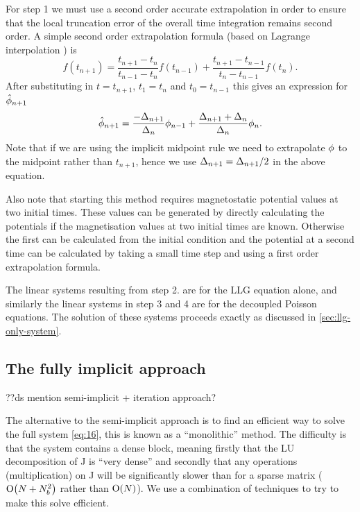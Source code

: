 For step 1 we must use a second order accurate extrapolation in order to ensure that the local truncation error of the overall time integration remains second order.
A simple second order extrapolation formula (based on Lagrange interpolation \cite[312]{Kincaid2002}) is
\begin{equation}
  \label{eq:65}
  f(t_{n+1}) = \frac{t_{n+1} - t_n}{t_{n-1} - t_n}f(t_{n-1}) + \frac{t_{n+1} - t_{n-1}}{t_n - t_{n-1}}f(t_n).
\end{equation}
After substituting in $t=t_{n+1}$, $t_1=t_n$ and $t_0=t_{n-1}$ this gives an expression for $\hat{\phi}_{n+1}$
\begin{equation}
  \label{eq:66}
  \hat{\phi}_{n+1} = \frac{-\Delta_{n+1}}{\Delta_{n}} \phi_{n-1} + \frac{\Delta_{n+1} + \Delta_{n}}{\Delta_{n}} \phi_n.
\end{equation}
Note that if we are using the implicit midpoint rule we need to extrapolate $\phi$ to the midpoint rather than $t_{n+1}$, hence we use $\Delta_{n+1} = \Delta_{n+1} /2$ in the above equation.

Also note that starting this method requires magnetostatic potential values at two initial times.
These values can be generated by directly calculating the potentials if the magnetisation values at two initial times are known.
Otherwise the first can be calculated from the initial condition and the potential at a second time can be calculated by taking a small time step and using a first order extrapolation formula.


The linear systems resulting from step 2. are for the LLG equation alone, and similarly the linear systems in step 3 and 4 are for the decoupled Poisson equations.
The solution of these systems proceeds exactly as discussed in \cref{sec:llg-only-system}.




\subsection{The fully implicit approach}
\label{sec:fully-implicit-bem}

??ds mention semi-implicit + iteration approach?

The alternative to the semi-implicit approach is to find an efficient way to solve the full system \cref{eq:16}, this is known as a ``monolithic'' method.
The difficulty is that the system contains a dense block, meaning firstly that the LU decomposition of J is ``very dense'' and secondly that any operations (\eg multiplication) on J will be significantly slower than for a sparse matrix ($\mathrm{O}{\left( N + N_b^2 \right)}$ rather than $\mathrm{O}{\left( N \right)}$).
We use a combination of techniques to try to make this solve efficient.

